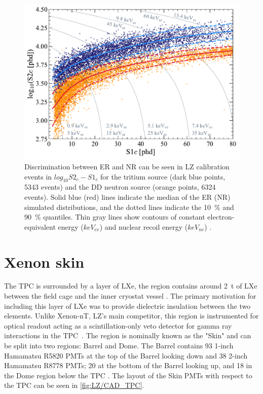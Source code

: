 \begin{figure}[!ht]
    \centering
    \includegraphics[width=0.8\linewidth]{figures/LZ/SR1WS_calOnly_0629.pdf}
    \caption{Discrimination between ER and NR can be seen in LZ calibration events in $log_{10}S2_{c}-S1_{c}$ for the tritium source (dark blue points, 5343 events) and the DD neutron source (orange points, 6324 events). Solid blue (red) lines indicate the median of the ER (NR) simulated distributions, and the dotted lines indicate the 10~\% and 90~\% quantiles. Thin gray lines show contours of constant electron-equivalent energy ($keV_{ee}$) and nuclear recoil energy ($keV_{nr}$) \cite{LZ:2022lsv}.}
    \label{fig:LZ/NRERBandExample}
\end{figure}

\section{Xenon skin}\label{sec:LZ/Skin}
The TPC is surrounded by a layer of LXe, the region contains around 2~t of LXe between the field cage and the inner cryostat vessel \cite{LZNIMA}. The primary motivation for including this layer of LXe was to provide dielectric insulation between the two elements. Unlike Xenon-nT, LZ's main competitor, this region is instrumented for optical readout acting as a scintillation-only veto detector for gamma ray interactions in the TPC~\cite{XENON:2024wpa}. The region is nominally known as the "Skin" and can be split into two regions: Barrel and Dome. The Barrel contains 93 1-inch Hamamatsu R5820 PMTs at the top of the Barrel looking down and 38 2-inch Hamamatsu R8778 PMTs; 20 at the bottom of the Barrel looking up, and 18 in the Dome region below the TPC \cite{LZNIMA}. The layout of the Skin PMTs with respect to the TPC can be seen in \autoref{fig:LZ/CAD_TPC}.

